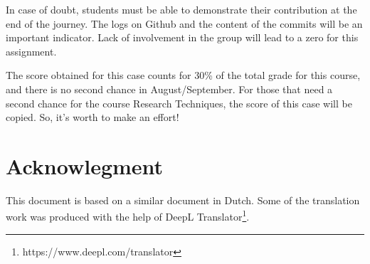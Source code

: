 \documentclass[fleqn,10pt]{artikeltin}
\begin{document}
In case of doubt, students must be able to demonstrate their contribution at the end of the journey. The logs on Github and the content of the commits will be an important indicator. Lack of involvement in the group will lead to a zero for this assignment.

The score obtained for this case counts for 30\% of the total grade for this course, and there is no second chance in August/September. For those that need a second chance for the course Research Techniques, the score of this case will be copied. So, it's worth to make an effort!

\section{Acknowlegment}
This document is based on a similar document in Dutch. Some of the translation work was produced with the help of DeepL Translator\footnote{https://www.deepl.com/translator}.


\printbibliography[heading=bibintoc]
\end{document}
